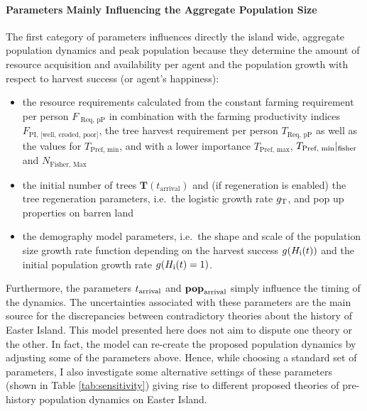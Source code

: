 \paragraph{Parameters Mainly Influencing the Aggregate Population Size}
The first category of parameters influences directly the island wide, aggregate population dynamics and peak population because they determine the amount of resource acquisition and availability per agent and the population growth with respect to harvest success (or agent's happiness): 
\begin{itemize}
	\item the resource requirements calculated from the constant farming requirement per person $F_\text{ Req, pP}$ in combination with the farming productivity indices $F_\text{PI, [well, eroded, poor]}$, the tree harvest requirement per person $T_\text{Req, pP}$ as well as the values for $T_\text{Pref, min}$, and with a lower importance $T_\text{Pref, max}$, $T_\text{Pref, min}|_{\rm fisher}$ and $N_\text{Fisher, Max}$
	\item the initial number of trees $\mathbf{T}(t_\text{arrival})$ and (if regeneration is enabled) the tree regeneration parameters, i.e.\ the logistic growth rate $g_{\rm T}$, and pop up properties on barren land 
	\item the demography model parameters, i.e.\ the shape and scale of the population size growth rate function depending on the harvest success $g(H_{\rm i}(t))$ and the initial population growth rate $g(H_{\rm i}(t)=1)$.
\end{itemize}
Furthermore, the parameters $t_{\rm arrival}$ and $\mathbf{pop}_{\rm arrival}$ simply influence the timing of the dynamics.
The uncertainties associated with these parameters are the main source for the  
discrepancies between contradictory theories about the history of Easter Island.
This model presented here does not aim to dispute one theory or the other.
In fact, the model can re-create the proposed population dynamics by adjusting some of the parameters above.
Hence, while choosing a standard set of parameters, I also investigate some alternative settings of these parameters (shown in Table \ref{tab:sensitivity}) giving rise to different proposed theories of pre-history population dynamics on Easter Island.

